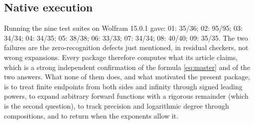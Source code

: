 \subsection{Native execution}

Running the nine test suites on Wolfram 15.0.1 gave: 01: 35/36; 02: 95/95; 03: 34/34; 04: 34/35; 05: 38/38; 06: 33/33; 07: 34/34; 08: 40/40; 09: 35/35. The two failures are the zero-recognition defects just mentioned, in residual checkers, not wrong expansions. Every package therefore computes what its article claims, which is a strong independent confirmation of the formula \eqref{eq:master} and of the two answers. What none of them does, and what motivated the present package, is to treat finite endpoints from both sides and infinity through signed leading powers, to expand arbitrary forward functions with a rigorous remainder (which is the second question), to track precision and logarithmic degree through compositions, and to return  when the exponents allow it.
